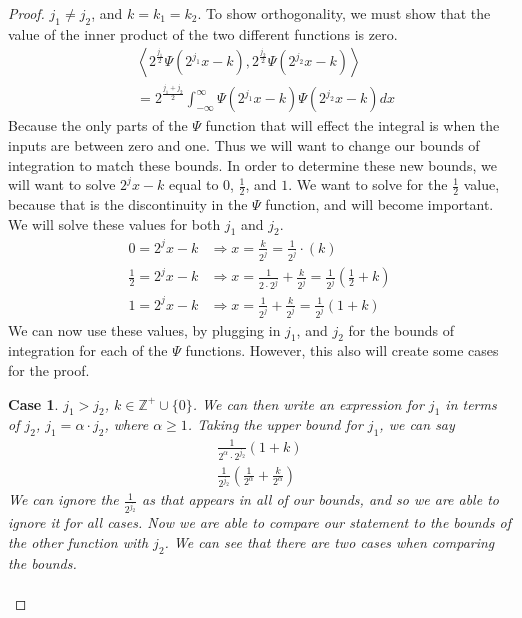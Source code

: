 \documentclass[12pt]{amsart}
\newcommand{\Z}{\mathbb{Z}}
\newtheorem{case}{Case}
\begin{document}
\begin{proof}\label{proof:1}
  $j_1 \neq j_2$, and $k = k_1 = k_2$. To show orthogonality, we must show that
  the value of the inner product of the two different functions is zero.
  \begin{align}
    &\left<2^{\frac{j_1}{2}}\Psi\left(2^{j_1}x-k\right),2^{\frac{j_2}{2}}\Psi\left(2^{j_2}x-k\right)\right>\\
    &=
    2^{\frac{j_1+j_2}{2}}\int_{-\infty}^{\infty}\Psi\left(2^{j_1}x-k\right)\Psi\left(2^{j_2}x-k\right)dx
  \end{align}
  Because the only parts of the $\Psi$ function that will effect the integral
  is when the inputs are between zero and one. Thus we will want to change our
  bounds of integration to match these bounds. In order to determine these new
  bounds, we will want to solve $2^{j}x-k$ equal to $0$, $\frac{1}{2}$, and
  $1$. We want to solve for the $\frac{1}{2}$ value, because that is the
  discontinuity in the $\Psi$ function, and will become important. We will
  solve these values for both $j_1$ and $j_2$.
  \begin{align}
    0 = 2^jx-k &\Rightarrow x = \frac{k}{2^j} = \frac{1}{2^j}\cdot (k)\\
    \frac{1}{2} = 2^jx-k &\Rightarrow x =
    \frac{1}{2\cdot 2^j}+\frac{k}{2^j} =
    \frac{1}{2^j}\left(\frac{1}{2}+k\right)\\
    1 = 2^jx-k &\Rightarrow x = \frac{1}{2^j}+\frac{k}{2^j} = \frac{1}{2^j}(1+k)
  \end{align}
  We can now use these values, by plugging in $j_1$, and $j_2$ for the bounds
  of integration for each of the $\Psi$ functions. However, this also will
  create some cases for the proof.
  \begin{case}\label{case:1.1}
    $j_1 > j_2$, $k\in\Z^+\cup\{0\}$. We can then write an expression for $j_1$
    in terms of $j_2$, $j_1 = \alpha \cdot j_2$, where $\alpha \geq 1$. Taking
    the upper bound for $j_1$, we can say
    \begin{align}
     \frac{1}{2^\alpha\cdot2^{j_2}}(1+k)\\
     \frac{1}{2^{j_2}}\left(\frac{1}{2^\alpha}+\frac{k}{2^\alpha}\right)
    \end{align}
    We can ignore the $\frac{1}{2^{j_2}}$ as that appears in all of our
    bounds, and so we are able to ignore it for all cases. Now we are able to
    compare our statement to the bounds of the other function with $j_2$. We
    can see that there are two cases when comparing the bounds.
    \begin{align}

\end{align}
\end{case}
\end{proof}
\end{document}
